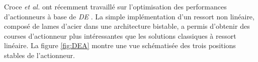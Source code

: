 Croce \emph{et al.} ont récemment travaillé sur l'optimisation des performances d'actionneurs à base de \emph{DE} \cite{Croce2021}. La simple implémentation d'un ressort non linéaire, composé de lames d'acier dans une architecture bistable, a permis d'obtenir des courses d'actionneur plus intéressantes que les solutions classiques à ressort linéaire. La figure \ref{fig:DEA} montre une vue schématisée des trois positions stables de l'actionneur. 

